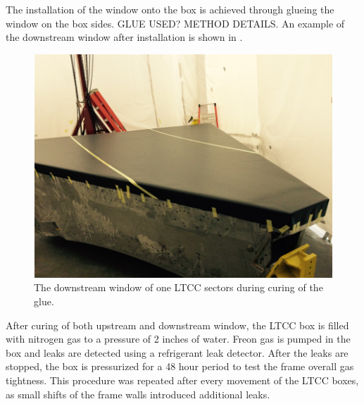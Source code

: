 The installation of the window onto the box is achieved through glueing the window on the box sides. GLUE USED? METHOD DETAILS.
An example of the downstream window after installation is shown in .

\begin{figure}
	\centering
	\includegraphics[width=1.0\columnwidth,keepaspectratio]{img/downstreamWindow.png}
	\caption{The downstream window of one LTCC sectors during curing of the glue. }
	\label{fig:downstreamWindow}
\end{figure}

After curing of both upstream and downstream window, the LTCC box is filled with nitrogen gas to a pressure of 2 inches of water.
Freon gas is pumped in the box and leaks are detected using a refrigerant leak detector. After the leaks are stopped, the box is pressurized
for a 48 hour period to test the frame overall gas tightness. This procedure was repeated after every movement of the LTCC boxes, as small
shifts of the frame walls introduced additional leaks.

